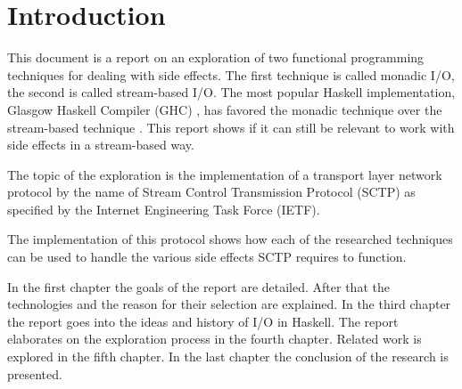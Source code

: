 \chapter*{Introduction}


This document is a report on an exploration of two functional programming techniques for dealing with side effects.
The first technique is called monadic I/O, the second is called stream-based I/O.
The most popular Haskell implementation, Glasgow Haskell Compiler (GHC) \cite{haskell_implementations}, has favored the monadic technique over the stream-based technique \cite{hudak_history_2007}.
This report shows if it can still be relevant to work with side effects in a stream-based way. 

The topic of the exploration is the implementation of a transport layer network protocol by the name of Stream Control Transmission Protocol (SCTP) as specified by the Internet Engineering Task Force (IETF).

The implementation of this protocol shows how each of the researched techniques can be used to handle the various side effects SCTP requires to function. 

In the first chapter the goals of the report are detailed. After that the technologies and the reason for their selection are explained. In the third chapter the report goes into the ideas and history of I/O in Haskell.
The report elaborates on the exploration process in the fourth chapter. Related work is explored in the fifth chapter.
In the last chapter the conclusion of the research is presented.
